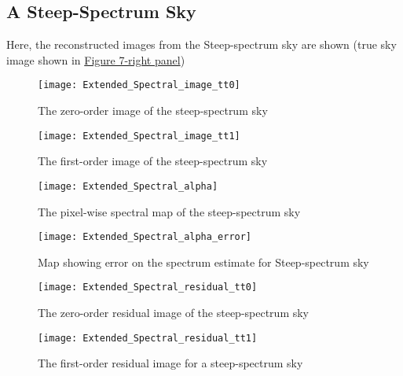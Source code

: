 \documentclass{article}
\begin{document}
\subsection{A Steep-Spectrum Sky}
Here, the reconstructed images from the Steep-spectrum sky are shown (true sky image shown in \hyperref[7]{Figure 7-right panel})
\begin{figure}[H]
\centering
\texttt{[image: Extended\_Spectral\_image\_tt0]}
\caption{The zero-order image of the steep-spectrum sky}
\label{fig:Extended_Spectral_image_tt0}
\end{figure}
\begin{figure}[H]
\centering
\texttt{[image: Extended\_Spectral\_image\_tt1]}
\caption{The first-order image of the steep-spectrum sky}
\label{fig:Extended_Spectral_image_tt1}
\end{figure}
\begin{figure}[H]
\centering
\texttt{[image: Extended\_Spectral\_alpha]}
\caption{The pixel-wise spectral map of the steep-spectrum sky}
\label{fig:Extended_Spectral_alpha}
\end{figure}
\begin{figure}[H]
\centering
\texttt{[image: Extended\_Spectral\_alpha\_error]}
\caption{Map showing error on the spectrum estimate for Steep-spectrum sky}
\label{fig:Extended_Spectral_alpha_error}
\end{figure}
\begin{figure}[H]
\centering
\texttt{[image: Extended\_Spectral\_residual\_tt0]}
\caption{The zero-order residual image of the steep-spectrum sky}
\label{fig:Extended_Spectral_residual_tt0}
\end{figure}
\begin{figure}[H]
\centering
\texttt{[image: Extended\_Spectral\_residual\_tt1]}
\caption{The first-order residual image for a steep-spectrum sky}
\label{fig:Extended_Spectral_residual_tt1}
\end{figure}
\end{document}
